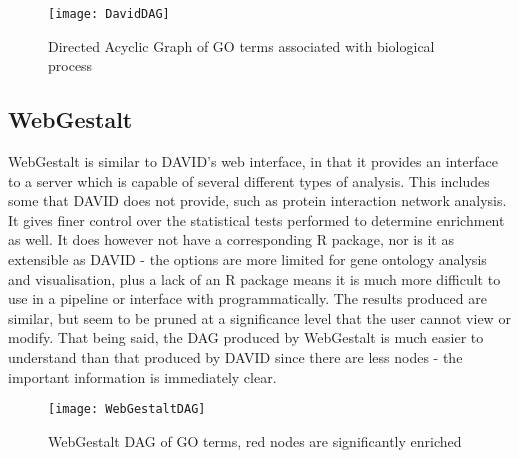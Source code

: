 \documentclass[11pt, oneside]{article}
\begin{document}
\begin{figure}[h!]
	\texttt{[image: DavidDAG]}
	\caption{Directed Acyclic Graph of GO terms associated with biological process}
\end{figure}

\subsection*{WebGestalt}
WebGestalt \cite{WebGestalt05} is similar to DAVID's web interface, in that it provides an interface to a server which is capable of several different types of analysis. This includes some that DAVID does not provide, such as protein interaction network analysis. It gives finer control over the statistical tests performed to determine enrichment as well. It does however not have a corresponding R package, nor is it as extensible as DAVID - the options are more limited for gene ontology analysis and visualisation, plus a lack of an R package means it is much more difficult to use in a pipeline or interface with programmatically. The results produced are similar, but seem to be pruned at a significance level that the user cannot view or modify. That being said, the DAG produced by WebGestalt is much easier to understand than that produced by DAVID since there are less nodes - the important information is immediately clear. 
\begin{figure}[h!]
	\texttt{[image: WebGestaltDAG]}
	\caption{WebGestalt DAG of GO terms, red nodes are significantly enriched}
\end{figure}
\end{document}
